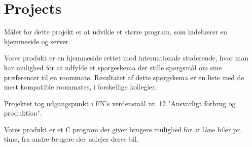 \documentclass[]{plushcv}
\begin{document}
\begin{minipage}[t]{0.70\textwidth}

\section{Projects}

\begin{tightemize}
\item Målet for dette projekt er at udvikle et større program, som indebærer en hjemmeside og server.
\item Vores produkt er en hjemmeside rettet mod internationale studerende, hvor man har mulighed for at udfylde et spørgeskema der stille spørgsmål om sine præferencer til en roommate. Resultatet af dette spørgskema er en liste med de mest kompatible roommates, i forskellige kollegier.
\end{tightemize}
\sectionsep

\begin{tightemize}
\item Projektet tog udgangspunkt i FN's verdensmål nr. 12 "Ansvarligt forbrug og produktion".  
\item Vores produkt er et C program der giver brugere mulighed for at låne biler pr. time, fra andre brugere der udlejer deres bil. 
\end{tightemize}
\sectionsep


%
%

\end{minipage} 
\hfill
\end{document}
